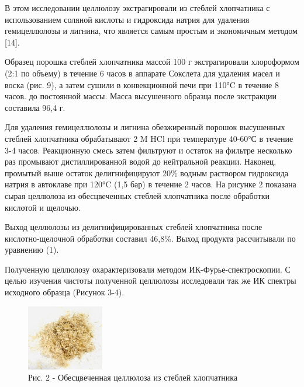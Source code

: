 \begin{multicols}{2}
В этом исследовании целлюлозу экстрагировали из стеблей хлопчатника с
использованием соляной кислоты и гидроксида натрия для удаления
гемицеллюлозы и лигнина, что является самым простым и экономичным
методом {[}14{]}.

Образец порошка стеблей хлопчатника массой 100 г экстрагировали
хлороформом (2:1 по объему) в течение 6 часов в аппарате Сокслета для
удаления масел и воска (рис. 9), а затем сушили в конвекционной печи при
110°C в течение 8 часов. до постоянной массы. Масса высушенного образца
после экстракции составила 96,4 г.

Для удаления гемицеллюлозы и лигнина обезжиренный порошок высушенных
стеблей хлопчатника обрабатывают 2 M HCl при температуре 40-60°С в
течение 3-4 часов. Реакционную смесь затем фильтруют и остаток на
фильтре несколько раз промывают дистиллированной водой до нейтральной
реакции. Наконец, промытый выше остаток делигнифицируют 20\% водным
раствором гидроксида натрия в автоклаве при 120°C (1,5 бар) в течение 2
часов. На рисунке 2 показана сырая целлюлоза из обесцвеченных стеблей
хлопчатника после обработки кислотой и щелочью.

Выход целлюлозы из делигнифицированных стеблей хлопчатника после
кислотно-щелочной обработки составил 46,8\%. Выход продукта рассчитывали
по уравнению (1).

Полученную целлюлозу охарактеризовали методом ИК-Фурье-спектроскопии. С
целью изучения чистоты полученной целлюлозы исследовали так же ИК
спектры исходного образца (Рисунок 3-4).
\end{multicols}

\begin{figure}[H]
	\centering
	\includegraphics[width=0.3\textwidth]{assets/77}
	\caption*{Рис. 2 - Обесцвеченная целлюлоза из стеблей хлопчатника}
\end{figure}

